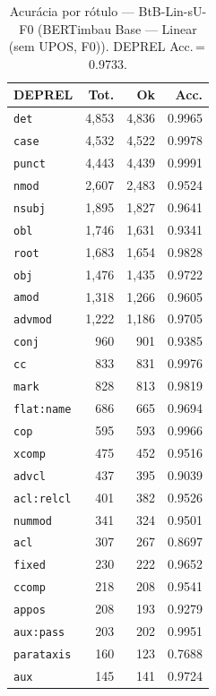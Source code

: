 \begin{table}[ht]
\centering
\caption{Acurácia por rótulo --- BtB-Lin-sU-F0 (BERTimbau Base — Linear (sem UPOS, F0)). DEPREL Acc.\,=\,0.9733.}
\label{tab:acc-predict-test-ablacao-linear-neuralmind-bert-base-portuguese-cased-fold0}
\scriptsize
\begin{tabular}{lrrr}
\toprule
\textbf{DEPREL} & \textbf{Tot.} & \textbf{Ok} & \textbf{Acc.} \\
\midrule
\texttt{det} & 4,853 & 4,836 & 0.9965 \\
\texttt{case} & 4,532 & 4,522 & 0.9978 \\
\texttt{punct} & 4,443 & 4,439 & 0.9991 \\
\texttt{nmod} & 2,607 & 2,483 & 0.9524 \\
\texttt{nsubj} & 1,895 & 1,827 & 0.9641 \\
\texttt{obl} & 1,746 & 1,631 & 0.9341 \\
\texttt{root} & 1,683 & 1,654 & 0.9828 \\
\texttt{obj} & 1,476 & 1,435 & 0.9722 \\
\texttt{amod} & 1,318 & 1,266 & 0.9605 \\
\texttt{advmod} & 1,222 & 1,186 & 0.9705 \\
\texttt{conj} & 960 & 901 & 0.9385 \\
\texttt{cc} & 833 & 831 & 0.9976 \\
\texttt{mark} & 828 & 813 & 0.9819 \\
\texttt{flat\!:\!name} & 686 & 665 & 0.9694 \\
\texttt{cop} & 595 & 593 & 0.9966 \\
\texttt{xcomp} & 475 & 452 & 0.9516 \\
\texttt{advcl} & 437 & 395 & 0.9039 \\
\texttt{acl\!:\!relcl} & 401 & 382 & 0.9526 \\
\texttt{nummod} & 341 & 324 & 0.9501 \\
\texttt{acl} & 307 & 267 & 0.8697 \\
\texttt{fixed} & 230 & 222 & 0.9652 \\
\texttt{ccomp} & 218 & 208 & 0.9541 \\
\texttt{appos} & 208 & 193 & 0.9279 \\
\texttt{aux\!:\!pass} & 203 & 202 & 0.9951 \\
\texttt{parataxis} & 160 & 123 & 0.7688 \\
\texttt{aux} & 145 & 141 & 0.9724 \\

\end{tabular}
\end{table}
